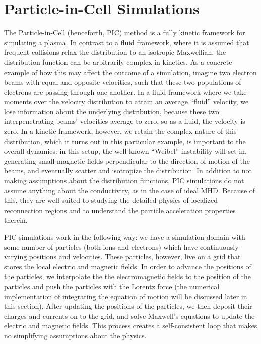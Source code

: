 \section{Particle-in-Cell Simulations}
The Particle-in-Cell (henceforth, PIC) method is a fully kinetic framework for simulating a plasma.  In contrast to a fluid framework, where it is assumed that frequent collisions relax the distribution to an isotropic Maxwellian, the distribution function can be arbitrarily complex in kinetics.  As a concrete example of how this may affect the outcome of a simulation, imagine two electron beams with equal and opposite velocities, such that these two populations of electrons are passing through one another.  In a fluid framework where we take moments over the velocity distribution to attain an average ``fluid'' velocity, we lose information about the underlying distribution, because these two interpenetrating beams' velocities average to zero, so as a fluid, the velocity is zero.  In a kinetic framework, however, we retain the complex nature of this distribution, which it turns out in this particular example, is important to the overall dynamics: in this setup, the well-known ``Weibel'' instability will set in, generating small magnetic fields perpendicular to the direction of motion of the beams, and eventually scatter and isotropize the distribution.  In addition to not making assumptions about the distribution functions, PIC simulations do not assume anything about the conductivity, as in the case of ideal MHD.  Because of this, they are well-suited to studying the detailed physics of localized reconnection regions and to understand the particle acceleration properties therein.

PIC simulations work in the following way: we have a simulation domain with some number of particles (both ions and electrons) which have continuously varying positions and velocities.  These particles, however, live on a grid that stores the local electric and magnetic fields.  In order to advance the positions of the particles, we interpolate the the electromagnetic fields to the position of the particles and push the particles with the Lorentz force (the numerical implementation of integrating the equation of motion will be discussed later in this section).  After updating the positions of the particles, we then deposit their charges and currents on to the grid, and solve Maxwell's equations to update the electric and magnetic fields.  This process creates a self-consistent loop that makes no simplifying assumptions about the physics.  

